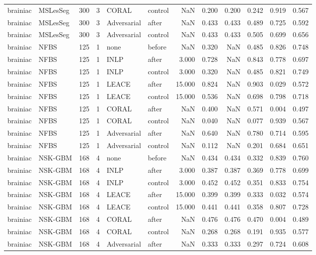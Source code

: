 \begin{tabular}{llrrllrrrrrr}
brainiac & MSLesSeg & 300 & 3 & CORAL & control & NaN & 0.200 & 0.200 & 0.242 & 0.919 & 0.567 \\
brainiac & MSLesSeg & 300 & 3 & Adversarial & after & NaN & 0.433 & 0.433 & 0.489 & 0.725 & 0.592 \\
brainiac & MSLesSeg & 300 & 3 & Adversarial & control & NaN & 0.433 & 0.433 & 0.505 & 0.699 & 0.656 \\
brainiac & NFBS & 125 & 1 & none & before & NaN & 0.320 & NaN & 0.485 & 0.826 & 0.748 \\
brainiac & NFBS & 125 & 1 & INLP & after & 3.000 & 0.728 & NaN & 0.843 & 0.778 & 0.697 \\
brainiac & NFBS & 125 & 1 & INLP & control & 3.000 & 0.320 & NaN & 0.485 & 0.821 & 0.749 \\
brainiac & NFBS & 125 & 1 & LEACE & after & 15.000 & 0.824 & NaN & 0.903 & 0.029 & 0.572 \\
brainiac & NFBS & 125 & 1 & LEACE & control & 15.000 & 0.536 & NaN & 0.698 & 0.798 & 0.718 \\
brainiac & NFBS & 125 & 1 & CORAL & after & NaN & 0.400 & NaN & 0.571 & 0.004 & 0.497 \\
brainiac & NFBS & 125 & 1 & CORAL & control & NaN & 0.040 & NaN & 0.077 & 0.939 & 0.567 \\
brainiac & NFBS & 125 & 1 & Adversarial & after & NaN & 0.640 & NaN & 0.780 & 0.714 & 0.595 \\
brainiac & NFBS & 125 & 1 & Adversarial & control & NaN & 0.112 & NaN & 0.201 & 0.684 & 0.651 \\
brainiac & NSK-GBM & 168 & 4 & none & before & NaN & 0.434 & 0.434 & 0.332 & 0.839 & 0.760 \\
brainiac & NSK-GBM & 168 & 4 & INLP & after & 3.000 & 0.387 & 0.387 & 0.369 & 0.778 & 0.699 \\
brainiac & NSK-GBM & 168 & 4 & INLP & control & 3.000 & 0.452 & 0.452 & 0.351 & 0.833 & 0.754 \\
brainiac & NSK-GBM & 168 & 4 & LEACE & after & 15.000 & 0.399 & 0.399 & 0.333 & 0.032 & 0.574 \\
brainiac & NSK-GBM & 168 & 4 & LEACE & control & 15.000 & 0.441 & 0.441 & 0.358 & 0.807 & 0.728 \\
brainiac & NSK-GBM & 168 & 4 & CORAL & after & NaN & 0.476 & 0.476 & 0.470 & 0.004 & 0.489 \\
brainiac & NSK-GBM & 168 & 4 & CORAL & control & NaN & 0.268 & 0.268 & 0.191 & 0.935 & 0.577 \\
brainiac & NSK-GBM & 168 & 4 & Adversarial & after & NaN & 0.333 & 0.333 & 0.297 & 0.724 & 0.608 \\

\end{tabular}
